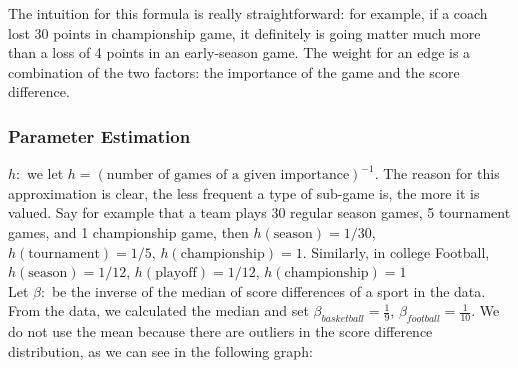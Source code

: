 \documentclass[11pt,notitlepage]{article}
\begin{document}
\noindent The intuition for this formula is really straightforward: for example, if a coach lost 30 points in championship game, it definitely is going matter much more than a loss of 4 points in an early-season game. The weight for an edge is a combination of the two factors: the importance of the game and the score difference.

\subsubsection*{Parameter Estimation}
\noindent $h:$ we let $h = (\text{number of games of a given importance})^{-1}$. The reason for this approximation is clear, the less frequent a type of sub-game is, the more it is valued. Say for example that a team  plays 30 regular season games, 5 tournament games, and 1 championship game, then $h(\mbox{season}) = 1/30$, $h(\mbox{tournament}) = 1/5$, $h(\mbox{championship}) = 1$. Similarly, in college Football, $h(\mbox{season}) = 1/12$, $h(\mbox{playoff}) = 1/12$, $h(\mbox{championship}) = 1$
\\

\noindent Let $\beta:$ be the inverse of the median of score differences of a sport in the data. From the data, we calculated the median and set $\beta_{basketball} = \frac{1}{9}$, $\beta_{football} = \frac{1}{10}$. We do not use the mean because there are outliers in the score difference distribution, as we can see in the following graph:
\\
\end{document}
